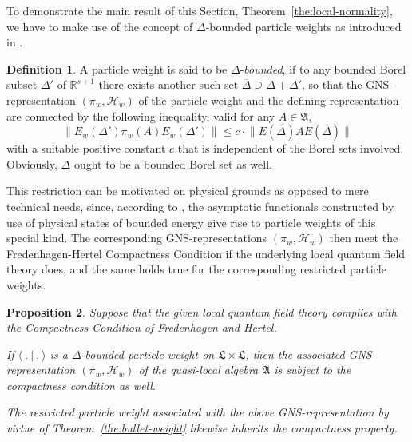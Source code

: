 \documentclass[a4paper,a4paper]{article}
\numberwithin{equation}{section}
\newcommand{\Afrak}{\mathfrak{A}}
\newcommand{\Lfrak}{\mathfrak{L}}
\newcommand{\Hscr}{\mathscr{H}}
\newcommand{\Rsone}{\mathbb{R}^{s + 1}}
\newcommand{\Deltabar}{\overline{\Delta}}
\newcommand{\EDbar}{E ( \overline{\Delta} )}
\newcommand{\EwDprime}{E_w ( \Delta' )}
\newcounter{propitem}
\newenvironment{proplist}{\begin{list}{(\roman{propitem})}%
  {\usecounter{propitem} \setlength{\topsep}{0ex}%
   \setlength{\parsep}{0.2ex} \setlength{\itemsep}{0.4ex}%
   \setlength{\leftmargin}{0em} \setlength{\itemindent}{0.5em}%
   }}{\end{list}}
\theoremstyle{definition}
\newtheorem{definition}{Definition}[section]
\theoremstyle{plain}
\newtheorem{proposition}[definition]{Proposition}
\theoremstyle{remark}
\theoremstyle{assumption}
\newcommand{\norm}[1]{\lVert #1 \rVert}
\newcommand{\scp}[2]{\langle #1 \vert #2 \rangle}
\begin{document}
  To demonstrate the main result of this Section,
  Theorem~\ref{the:local-normality}, we have to make use of the
  concept of $\Delta$-bounded particle weights as introduced in
  \cite[Definition~3.15]{porrmann:2002a}.
  \begin{definition}
    \label{def:Delta-boundedness}
    A particle weight is said to be $\Delta$-\emph{bounded}, if to
    any bounded Borel subset $\Delta'$ of $\Rsone$ there exists
    another such set $\Deltabar \supseteq \Delta + \Delta'$, so that
    the GNS-representation $( \pi_w , \Hscr_w )$ of the particle
    weight and the defining representation are connected by the
    following inequality, valid for any $A \in \Afrak$,
    \begin{equation}
      \label{eq:Delta-boundedness}
      \norm{\EwDprime \pi_w ( A ) \EwDprime} \leqslant c \cdot
      \norm{\EDbar A \EDbar}
    \end{equation}
    with a suitable positive constant $c$ that is independent of the
    Borel sets involved. Obviously, $\Delta$ ought to be a bounded
    Borel set as well.
  \end{definition}
  This restriction can be motivated on physical grounds as opposed to
  mere technical needs, since, according to
  \cite[Lemma~3.16]{porrmann:2002a}, the asymptotic functionals
  constructed by use of physical states of bounded energy give rise to
  particle weights of this special kind. The corresponding
  GNS-representations $( \pi_w , \Hscr_w )$ then meet the
  Fredenhagen-Hertel Compactness Condition if the underlying local
  quantum field theory does, and the same holds true for the
  corresponding restricted particle weights.
  \begin{proposition}
    \label{pro:weight-precompactness}
    Suppose that the given local quantum field theory complies with
    the Compactness Condition of Fredenhagen and Hertel.
    \begin{proplist}
    \item If $\scp{~.~}{~.~}$ is a $\Delta$-bounded particle weight on
      $\Lfrak \times \Lfrak$, then the associated GNS-representa\-tion
      $( \pi_w , \Hscr_w )$ of the quasi-local algebra $\Afrak$ is
      subject to the compactness condition as well.
    \item The restricted particle weight associated with the above
      GNS-representation by virtue of Theorem~\ref{the:bullet-weight}
      likewise inherits the compactness property.
    \end{proplist}
  \end{proposition}
\end{document}
